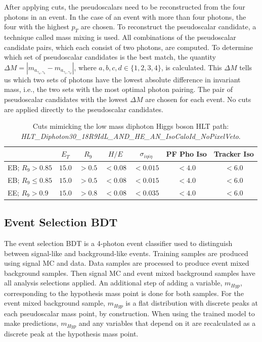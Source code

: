 \documentclass[12pt]{article}
\begin{document}
After applying cuts, the pseudoscalars need to be reconstructed from the four photons in an event. In the case of an event with more than four photons, the four with the highest $p_T$ are chosen. To reconstruct the pseudoscalar candidate, a technique called mass mixing is used. All combinations of the pseudoscalar candidate pairs, which each consist of two photons, are computed. To determine which set of pseudoscalar candidates is the best match, the quantity $\Delta M = |m_{a_{\gamma_{a}, \gamma_{b}}} - m_{a_{\gamma_{c}, \gamma_{d}}}|$, where $a,b,c,d \in \{1,2,3,4\}$, is calculated. This $\Delta M$ tells us which two sets of photons have the lowest absolute difference in invariant mass, i.e., the two sets with the most optimal photon pairing. The pair of pseudoscalar candidates with the lowest $\Delta M$ are chosen for each event. No cuts are applied directly to the pseudoscalar candidates.\par

\begin{table}
   \centering
   \begin{tabular}{l|c|c|c|c|c|c}
        & $E_T$ & $R_9$ & $H/E$ & $\sigma_{i\eta i\eta}$ & PF Pho Iso & Tracker Iso\\ \hline
       EB; $R_9>0.85$ & $15.0$ & $> 0.5$ & $<0.08$ & $<0.015$ & $<4.0$ & $<6.0$\\
       EB; $R_9\leq0.85$ & $15.0$ & $> 0.5$ & $<0.08$ & $<0.015$ & $<4.0$ & $<6.0$\\
       EE; $R_9>0.9$ & $15.0$ & $> 0.8$ & $<0.08$ & $<0.035$ & $<4.0$ & $<6.0$
   \end{tabular}
   \caption{Cuts mimicking the low mass diphoton Higgs boson HLT path:\\ \textit{HLT\_Diphoton30\_18R9IdL\_AND\_HE\_AN\_IsoCaloId\_NoPixelVeto}.}
   \label{tab:hlt_cuts_2018}
\end{table}

\subsection{Event Selection BDT}
The event selection BDT is a 4-photon event classifier used to distinguish between signal-like and background-like events. Training samples are produced using signal MC and data. Data samples are processed to produce event mixed background samples. Then signal MC and event mixed background samples have all analysis selections applied. An additional step of adding a variable, $m_{Hyp}$, corresponding to the hypothesis mass point is done for both samples. For the event mixed background sample, $m_{Hyp}$ is a flat distribution with discrete peaks at each pseudoscalar mass point, by construction. When using the trained model to make predictions, $m_{Hyp}$ and any variables that depend on it are recalculated as a discrete peak at the hypothesis mass point.\par
\end{document}
